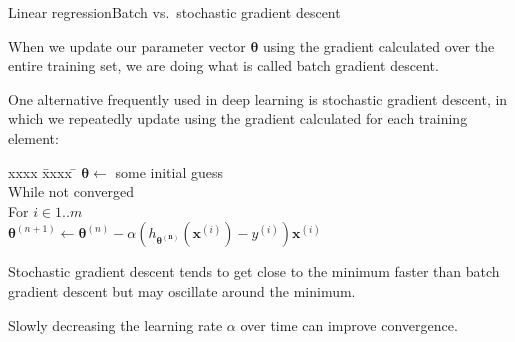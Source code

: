 \documentclass{beamer}
\renewcommand{\vec}[1]{\boldsymbol{#1}}
\begin{document}
\begin{frame}{Linear regression}{Batch vs.\ stochastic gradient descent}
  \label{sgd}
  
  When we update our parameter vector $\vec{\theta}$ using the
  gradient calculated over the \alert{entire training set}, we are
  doing what is called \alert{batch} gradient descent.

  \medskip

  One alternative frequently used in deep learning is
  \alert{stochastic} gradient descent, in which we repeatedly update
  using the gradient calculated for \alert{each training element}:

  \begin{tabbing}
    xxxx \= xxxx \= \kill
    $\vec{\theta} \leftarrow$ some initial guess \\
    While not converged \\
    \> For $i \in 1..m$ \\
    \> \> $\vec{\theta}^{(n+1)} \leftarrow \vec{\theta}^{(n)} - \alpha (h_{\vec{\theta^{(n)}}}(\vec{x}^{(i)}) - y^{(i)})\vec{x}^{(i)}$ 
  \end{tabbing}

  \medskip

  Stochastic gradient descent tends to get close to the minimum faster
  than batch gradient descent but may \alert{oscillate} around the minimum.

  \medskip

  Slowly \alert{decreasing} the learning rate $\alpha$ over time can
  improve convergence.
  
\end{frame}
\end{document}
